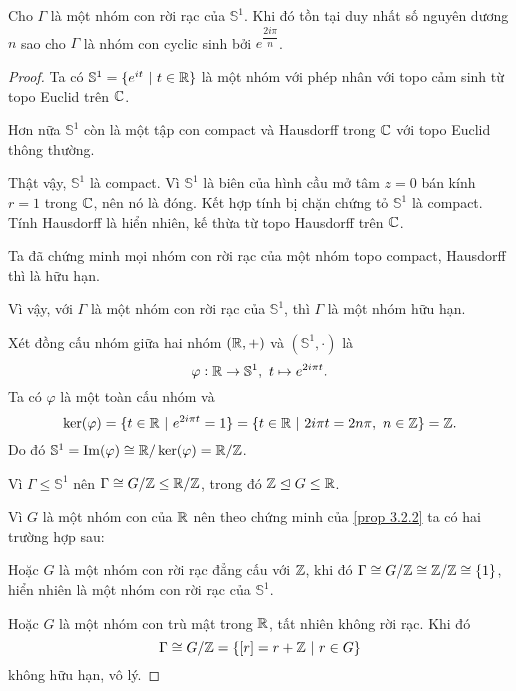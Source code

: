 \begin{prop}\label{prop 3.2.5}
    Cho $\Gamma$ là một nhóm con rời rạc của $\mathbb{S}^1$. Khi đó tồn tại duy nhất số nguyên dương $n$ sao cho $\Gamma$ là nhóm con cyclic sinh bởi $e^{\dfrac{2i\pi}{n}}$.
\end{prop}
\begin{proof}
    Ta có $\mathbb{S}^1 = \{e^{it}~|~t\in \mathbb{R}\}$ là một nhóm với phép nhân với topo cảm sinh từ topo Euclid trên $\mathbb{C}$.

    Hơn nữa $\mathbb{S}^1$ còn là một tập con compact và Hausdorff trong $\mathbb{C}$ với topo Euclid thông thường. 
    
    Thật vậy, $\mathbb{S}^1$ là compact. Vì $\mathbb{S}^1$ là biên của hình cầu mở tâm $z=0$ bán kính $r=1$ trong $\mathbb{C}$, nên nó là đóng. Kết hợp tính bị chặn chứng tỏ $\mathbb{S}^1$ là compact. Tính Hausdorff là hiển nhiên, kế thừa từ topo Hausdorff trên $\mathbb{C}$. 

    Ta đã chứng minh mọi nhóm con rời rạc của một nhóm topo compact, Hausdorff thì là hữu hạn.
    
    Vì vậy, với $\Gamma$ là một nhóm con rời rạc của $\mathbb{S}^1$, thì $\Gamma$ là một nhóm hữu hạn.


    
    Xét đồng cấu nhóm giữa hai nhóm $(\mathbb{R},+)$ và $(\mathbb{S}^1,\cdot)$ là
    \[\varphi: \mathbb{R} \to \mathbb{S}^1,~t \mapsto e^{2i\pi t}.\]
    Ta có $\varphi$ là một toàn cấu nhóm và 
    \[\ker(\varphi) = \{t \in \mathbb{R}~|~e^{2i\pi t} = 1\} = \{t \in \mathbb{R}~|~2i\pi t = 2n\pi,~n\in \mathbb{Z}\} = \mathbb{Z}.\]
    Do đó $\mathbb{S}^1 = \operatorname{Im}(\varphi) \cong \mathbb{R}/\ker(\varphi) = \mathbb{R} / \mathbb{Z}$.
      
    Vì $\Gamma \leq \mathbb{S}^1$ nên $\Gamma \cong G/\mathbb{Z} \leq \mathbb{R}/\mathbb{Z}$, trong đó $\mathbb{Z} \trianglelefteq G \leq \mathbb{R}$.

    Vì $G$ là một nhóm con của $\mathbb{R}$ nên theo chứng minh của \ref{prop 3.2.2} ta có hai trường hợp sau:
    
    Hoặc $G$ là một nhóm con rời rạc đẳng cấu với $\mathbb{Z}$, khi đó $\Gamma \cong G/\mathbb{Z} \cong \mathbb{Z}/\mathbb{Z} \cong \{1\}$, hiển nhiên là một nhóm con rời rạc của $\mathbb{S}^1$.
    
    Hoặc $G$ là một nhóm con trù mật trong $\mathbb{R}$, tất nhiên không rời rạc. Khi đó \[\Gamma \cong G/\mathbb{Z} = \{[r] = r+\mathbb{Z}~|~r\in G\}\] không hữu hạn, vô lý.
\end{proof}
